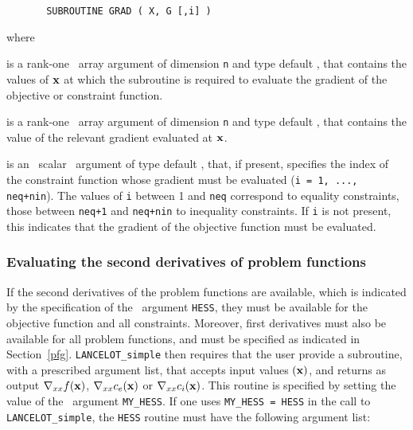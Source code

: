 \documentclass{galahad}
\begin{document}
\def\baselinestretch{0.8}
{\tt \begin{verbatim}
       SUBROUTINE GRAD ( X, G [,i] )
\end{verbatim} }
\def\baselinestretch{1.0}
\noindent
where
\begin{description}
 is a rank-one \intentin\ array argument of
dimension {\tt n} and type default \realdp,
that contains the values of ${\mathbf{x}}$ at which the
subroutine is required to evaluate the gradient
of the objective or constraint function.

 is a rank-one \intentout\ array argument of dimension {\tt n}  and
  type default \realdp, that contains the value of the relevant
  gradient evaluated at ${\mathbf{x}}$.

 is an \optional\ scalar \intentin\ argument of type default \integer,
that, if present, specifies the index of the constraint function whose
gradient must be evaluated  ({\tt i = 1, ..., neq+nin}).  The values of {\tt i}
between 1 and {\tt neq} correspond to equality constraints, those between
{\tt neq+1} and {\tt neq+nin} to inequality constraints. If {\tt i} is not
present, this indicates that the gradient of the objective function must be
evaluated.
\end{description}

\subsubsection{Evaluating the second derivatives of problem
functions\label{pfh}}

If the second derivatives of the problem functions are available, which is
indicated by the specification of the \optional\ argument {\tt HESS}, they must
be available for the objective function and all constraints. Moreover, first
derivatives must also be available for all problem functions, and must be
specified as indicated in Section~\ref{pfg}.
{\tt LANCELOT\_simple} then requires that the user provide a subroutine, with
a prescribed argument list, that accepts input values $({\mathbf{x}})$, and returns as
output  $\nabla_{xx}f({\mathbf{x}})$,  $\nabla_{xx}c_e({\mathbf{x}})$ or
$\nabla_{xx}c_i({\mathbf{x}})$. This routine is specified by setting the value of the
\optional\ argument {\tt MY\_HESS}. If one uses {\tt MY\_HESS = HESS} in the
call to {\tt LANCELOT\_simple}, the {\tt HESS} routine must have the following
argument list:
\end{document}
